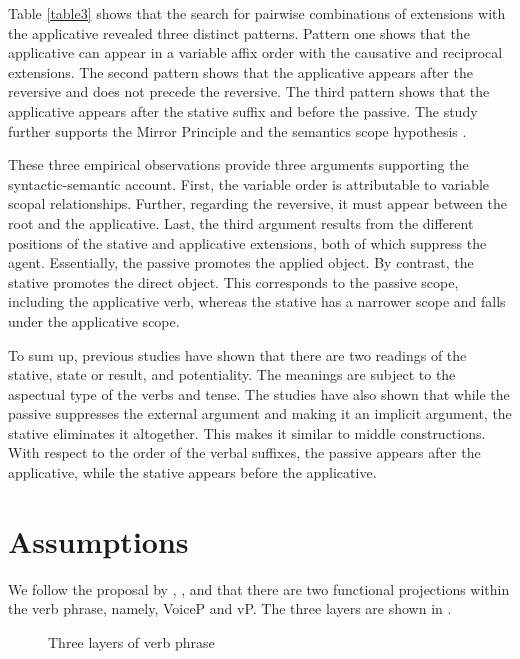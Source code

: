 \documentclass[output=paper]{langscibook}
\begin{document}
Table \ref{table3} shows that the search for pairwise combinations of extensions with the applicative revealed three distinct patterns. Pattern one shows that the applicative can appear in a variable affix order with the causative and reciprocal extensions. The second pattern shows that the applicative appears after the reversive and does not precede the reversive. The third pattern shows  that the applicative appears after the stative suffix and before the passive. The study further supports the Mirror Principle \citep{Baker1985} and the semantics scope hypothesis \citep{rice2000}. 

These three empirical observations provide three arguments supporting the syntactic-semantic account. First, the variable order is attributable to variable scopal relationships. Further, regarding the reversive, it must appear between the root and the applicative. Last, the third argument results from the different positions of the stative and applicative extensions, both of which suppress the agent. Essentially, the passive promotes the applied object. By contrast, the stative promotes the direct object. This corresponds to the passive scope, including the applicative verb, whereas the stative has a narrower scope and falls under the applicative scope. 

To sum up, previous studies have shown that there are two readings of the stative, state or result, and potentiality. The meanings are subject to the aspectual type of the verbs and tense. The studies have also shown that while the passive suppresses the external argument and making it an implicit argument, the stative eliminates it altogether. This makes it similar to middle constructions. With respect to the order of the verbal suffixes, the passive appears after the applicative, while the stative appears before the applicative.  

\section{Assumptions}
We follow the proposal by \citet{Folli:2007aa}, \citet{legate14}, and \citet{pylkkanen08} that there are two functional projections within the verb phrase, namely, VoiceP and vP. The three layers are shown in .

\begin{figure}
\caption{\label{fig:rmtree}Three layers of verb phrase}
\end{figure}
\end{document}

